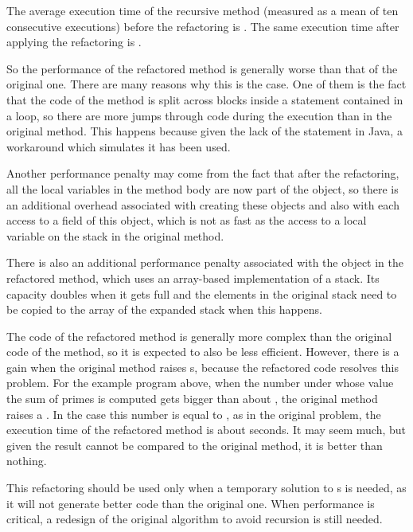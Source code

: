 The average execution time of the  recursive method (measured as a mean of ten consecutive executions)
before the refactoring is . The same execution time after applying the refactoring is .

So the performance of the refactored method is generally worse than that of the original one. There are many
reasons why this is the case. One of them is the fact that the code of the method is split across blocks inside a
 statement contained in a  loop, so there are more jumps through code during the execution than
in the original method. This happens because given the lack of the  statement in Java, a workaround which
simulates it has been used.

Another performance penalty may come from the fact that after the refactoring, all the local variables in the method
body are now part of the  object, so there is an additional overhead associated with creating these objects
and also with each access to a field of this object, which is not as fast as the access to a local variable on the stack
in the original method.

There is also an additional performance penalty associated with the  object in the refactored method, which
uses an array-based implementation of a stack. Its capacity doubles when it gets full and the elements in the original
stack need to be copied to the array of the expanded stack when this happens.

The code of the refactored method is generally more complex than the original code of the method, so it is expected to
also be less efficient. However, there is a gain when the original method raises s, because the
refactored code resolves this problem. For the example program above, when the number under whose value the sum of
primes is computed gets bigger than about , the original method raises a . In the
case this number is equal to , as in the original problem, the execution time of the refactored method is
about  seconds. It may seem much, but given the result cannot be compared to the original method, it is better
than nothing.

This refactoring should be used only when a temporary solution to s is needed, as it will not
generate better code than the original one. When performance is critical, a redesign of the original algorithm to avoid
recursion is still needed.